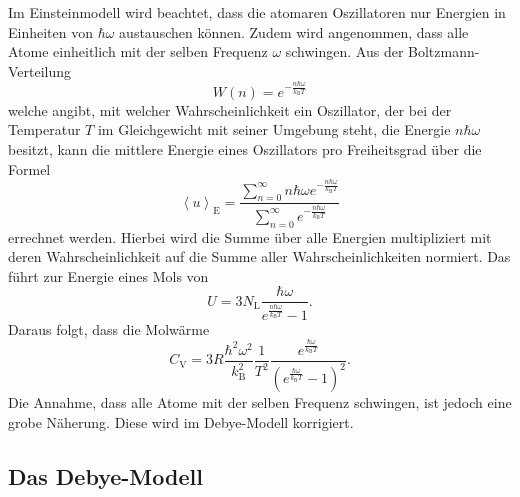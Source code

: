 Im Einsteinmodell wird beachtet, dass die atomaren Oszillatoren nur Energien in Einheiten von $\hbar\omega$ austauschen können.
Zudem wird angenommen, dass alle Atome einheitlich mit der selben Frequenz $\omega$ schwingen.
Aus der Boltzmann-Verteilung
\begin{equation}
  W(n) = e^{-\frac{n\hbar\omega}{k_{\text{B}}T}}
\end{equation}
welche angibt, mit welcher Wahrscheinlichkeit ein Oszillator, der bei der Temperatur $T$ im Gleichgewicht mit seiner Umgebung steht, die Energie $n\hbar\omega$ besitzt, kann die mittlere Energie eines Oszillators pro Freiheitsgrad über die Formel
\begin{equation}
  \left\langle u \right\rangle_{\text{E}} = \frac{\sum_{n=0}^{\infty}n\hbar\omega e^{-\frac{n\hbar\omega}{k_{\text{B}}T}}}{\sum_{n=0}^{\infty} e^{-\frac{n\hbar\omega}{k_{\text{B}}T}}}
\end{equation}
errechnet werden.
Hierbei wird die Summe über alle Energien multipliziert mit deren Wahrscheinlichkeit auf die Summe aller Wahrscheinlichkeiten normiert.
Das führt zur Energie eines Mols von
\begin{equation}
  U = 3N_{\text{L}}\frac{\hbar\omega}{e^{\frac{n\hbar\omega}{k_{\text{B}}T}}-1}.
\end{equation}
Daraus folgt, dass die Molwärme
\begin{equation}
  C_{\text{V}} = 3R\frac{\hbar^2\omega^2}{k_{\text{B}}^2}\frac{1}{T^2}\frac{e^{\frac{\hbar\omega}{k_{\text{B}}T}}}{\left(e^{\frac{\hbar\omega}{k_{\text{B}}T}}-1\right)^2}.
\end{equation}
Die Annahme, dass alle Atome mit der selben Frequenz schwingen, ist jedoch eine grobe Näherung. Diese wird im Debye-Modell korrigiert.

\subsection{Das Debye-Modell}

